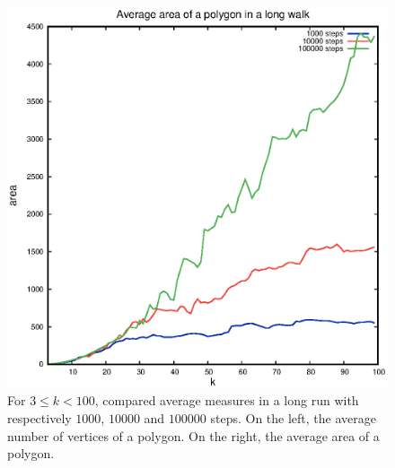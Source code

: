 \documentclass[a4paper]{article}
\begin{document}
\begin{figure}[t]
\begin{center}
\begin{minipage}[c]{.45\linewidth}
      \includegraphics[scale=.4]{volume}
    \end{minipage}
    \caption{For $3\leq{k}<100$, compared average measures in a long run with respectively $1000$, $10000$ and $100000$ steps. On the left, the average number of vertices of a polygon. On the right, the average area of a polygon.}
    \label{Fig.NV}
  \end{center}
\end{figure}
\end{document}
